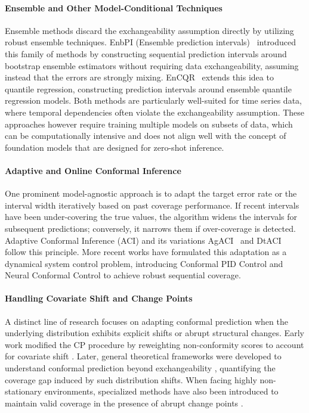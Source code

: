 \documentclass[12pt, a4paper]{article}
\begin{document}
\paragraph{Ensemble and Other Model-Conditional Techniques}
Ensemble methods discard the exchangeability assumption directly by utilizing robust ensemble techniques. EnbPI (Ensemble prediction intervals)~\cite{enbpi-1} introduced this family of methods by constructing sequential prediction intervals around bootstrap ensemble estimators without requiring data exchangeability, assuming instead that the errors are strongly mixing. EnCQR~\cite{encqr} extends this idea to quantile regression, constructing prediction intervals around ensemble quantile regression models. Both methods are particularly well-suited for time series data, where temporal dependencies often violate the exchangeability assumption. These approaches however require training multiple models on subsets of data, which can be computationally intensive and does not align well with the concept of foundation models that are designed for zero-shot inference.

\paragraph{Adaptive and Online Conformal Inference}
One prominent model-agnostic approach is to adapt the target error rate or the interval width iteratively based on past coverage performance. If recent intervals have been under-covering the true values, the algorithm widens the intervals for subsequent predictions; conversely, it narrows them if over-coverage is detected. Adaptive Conformal Inference (ACI) \cite{aci} and its variations AgACI~\cite{agaci} and DtACI~\cite{dtaci} follow this principle. More recent works have formulated this adaptation as a dynamical system control problem, introducing Conformal PID Control \cite{c-pid} and Neural Conformal Control \cite{ncc} to achieve robust sequential coverage.

\paragraph{Handling Covariate Shift and Change Points}
A distinct line of research focuses on adapting conformal prediction when the underlying distribution exhibits explicit shifts or abrupt structural changes. Early work modified the CP procedure by reweighting non-conformity scores to account for covariate shift \cite{weighted-cp}. Later, general theoretical frameworks were developed to understand conformal prediction beyond exchangeability \cite{nex-cp}, quantifying the coverage gap induced by such distribution shifts. When facing highly non-stationary environments, specialized methods have also been introduced to maintain valid coverage in the presence of abrupt change points \cite{cptc}.
\end{document}
